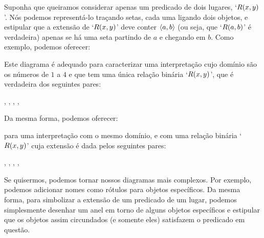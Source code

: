 Suponha que queiramos considerar apenas um predicado de dois lugares, `$\mathord{R}(x,y)$'.
Nós podemos representá-lo traçando setas, cada uma ligando dois objetos, e estipular que a extensão de `$\mathord{R}(x,y)$' deve conter $\mathopen{\langle}a,b\mathclose{\rangle}$ (ou seja, que `$\mathord{R}(a,b)$' é verdadeira) apenas se há uma seta partindo de $a$ e chegando em $b$.
Como exemplo, podemos oferecer:
\begin{center}
\end{center}
Este diagrama é adequado para caracterizar uma interpretação cujo domínio são os números de $1$ a $4$ e que tem uma única relação binária `$\mathord{R}(x,y)$', que é verdadeira dos seguintes pares:
	\begin{center}
		, 
		, 
		, 
		, 
	\end{center}
Da mesma forma, podemos oferecer:

\begin{center}
\end{center}
para uma interpretação com o mesmo domínio, e com uma relação binária `$\mathord{R}(x,y)$' cuja extensão é dada pelos seguintes pares:
	\begin{center}
		, 
		, 
		, 
		,
	\end{center}
Se quisermos, podemos tornar nossos diagramas mais complexos. Por exemplo, podemos adicionar nomes como rótulos para objetos específicos.
Da mesma forma, para simbolizar a extensão de um predicado de um lugar, podemos simplesmente desenhar um anel em torno de alguns objetos específicos e estipular que os objetos assim circundados (e somente eles) satisfazem o predicado em questão. 


